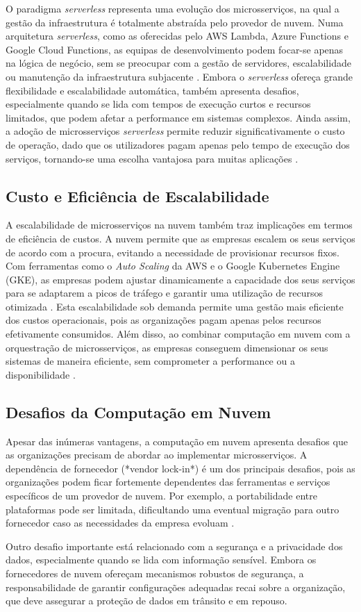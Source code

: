 O paradigma \textit{serverless} representa uma evolução dos microsserviços, na qual a gestão da infraestrutura é totalmente abstraída pelo provedor de nuvem. Numa arquitetura \textit{serverless}, como as oferecidas pelo AWS Lambda, Azure Functions e Google Cloud Functions, as equipas de desenvolvimento podem focar-se apenas na lógica de negócio, sem se preocupar com a gestão de servidores, escalabilidade ou manutenção da infraestrutura subjacente \cite{Dragoni2017}. Embora o \textit{serverless} ofereça grande flexibilidade e escalabilidade automática, também apresenta desafios, especialmente quando se lida com tempos de execução curtos e recursos limitados, que podem afetar a performance em sistemas complexos. Ainda assim, a adoção de microsserviços \textit{serverless} permite reduzir significativamente o custo de operação, dado que os utilizadores pagam apenas pelo tempo de execução dos serviços, tornando-se uma escolha vantajosa para muitas aplicações \cite{Richardson2018}.

\subsection{Custo e Eficiência de Escalabilidade}

A escalabilidade de microsserviços na nuvem também traz implicações em termos de eficiência de custos. A nuvem permite que as empresas escalem os seus serviços de acordo com a procura, evitando a necessidade de provisionar recursos fixos. Com ferramentas como o \textit{Auto Scaling} da AWS e o Google Kubernetes Engine (GKE), as empresas podem ajustar dinamicamente a capacidade dos seus serviços para se adaptarem a picos de tráfego e garantir uma utilização de recursos otimizada \cite{Dragoni2017}. Esta escalabilidade sob demanda permite uma gestão mais eficiente dos custos operacionais, pois as organizações pagam apenas pelos recursos efetivamente consumidos. Além disso, ao combinar computação em nuvem com a orquestração de microsserviços, as empresas conseguem dimensionar os seus sistemas de maneira eficiente, sem comprometer a performance ou a disponibilidade \cite{Blinowski2022}.

\subsection{Desafios da Computação em Nuvem}

Apesar das inúmeras vantagens, a computação em nuvem apresenta desafios que as organizações precisam de abordar ao implementar microsserviços. A dependência de fornecedor (*vendor lock-in*) é um dos principais desafios, pois as organizações podem ficar fortemente dependentes das ferramentas e serviços específicos de um provedor de nuvem. Por exemplo, a portabilidade entre plataformas pode ser limitada, dificultando uma eventual migração para outro fornecedor caso as necessidades da empresa evoluam \cite{Richardson2018}.

Outro desafio importante está relacionado com a segurança e a privacidade dos dados, especialmente quando se lida com informação sensível. Embora os fornecedores de nuvem ofereçam mecanismos robustos de segurança, a responsabilidade de garantir configurações adequadas recai sobre a organização, que deve assegurar a proteção de dados em trânsito e em repouso.
